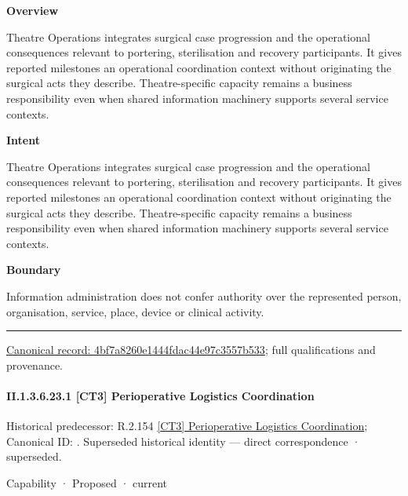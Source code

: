 \textbf{Overview}



Theatre Operations integrates surgical case progression and the operational consequences relevant to portering, sterilisation and recovery participants. It gives reported milestones an operational coordination context without originating the surgical acts they describe. Theatre-specific capacity remains a business responsibility even when shared information machinery supports several service contexts.



\textbf{Intent}



Theatre Operations integrates surgical case progression and the operational consequences relevant to portering, sterilisation and recovery participants. It gives reported milestones an operational coordination context without originating the surgical acts they describe. Theatre-specific capacity remains a business responsibility even when shared information machinery supports several service contexts.



\textbf{Boundary}



Information administration does not confer authority over the represented person, organisation, service, place, device or clinical activity.



\medskip\hrule\medskip

{\footnotesize \href{../../../../continuum/strategy/capability/4bf7a8260e1444fdac44e97c3557b533.md}{Canonical record: 4bf7a8260e1444fdac44e97c3557b533}; full qualifications and provenance.}\par
\paragraph*{II.1.3.6.23.1 [CT3] Perioperative Logistics Coordination}
\label{navigation:II.1.3.6.23.1}

{\small Historical predecessor: R.2.154 \hyperref[element:e7813a06b9df462fa135c299261f192e]{[CT3] Perioperative Logistics Coordination}; Canonical ID: \texttt{}. Superseded historical identity — direct correspondence · superseded.}\par
\label{element:6b7c08b60b5b48519bfe4b6f993dd6fb}
{\small Capability · Proposed · current}\par

